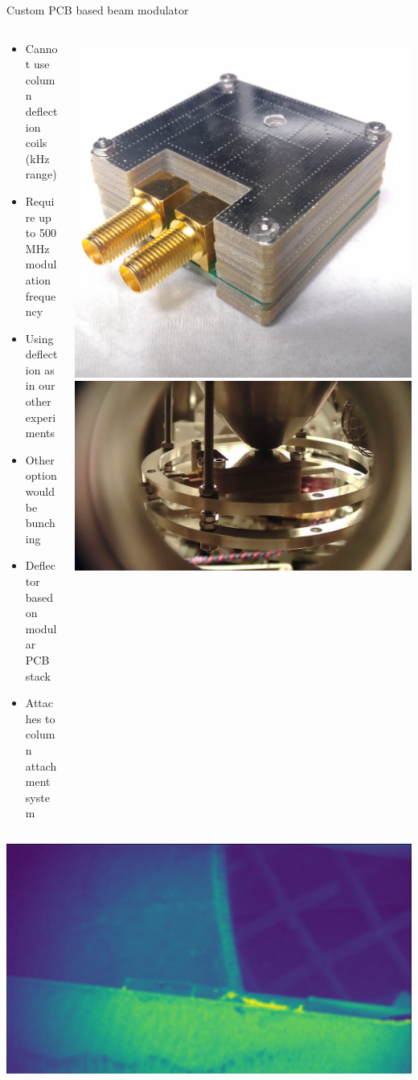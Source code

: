 \documentclass[final]{beamer}
\begin{document}
\begin{frame}[fragile]{}
\begin{columns}[T]
\begin{column}{.49\linewidth}
	\begin{block}{\Large Custom PCB based beam modulator}
		\begin{columns}
			\begin{column}{0.45\columnwidth}
				\begin{itemize}
					\item Cannot use column deflection coils (kHz range)
					\item Require up to 500 MHz modulation frequency
					\item Using deflection as in our other experiments
					\item Other option would be bunching
					\item Deflector based on modular PCB stack
					\item Attaches to column attachment system
				\end{itemize}
			\end{column}
			\begin{column}{0.45\columnwidth}
				\includegraphics[width=0.49\columnwidth]{./figures/kicker2_02.jpg}
				\includegraphics[width=0.49\columnwidth]{./figures/colattach03.png}
			\end{column}
		\end{columns}
		\vspace{1cm}
		\begin{columns}
			\begin{column}{0.45\columnwidth}
				\includegraphics[width=0.49\columnwidth]{./figures/kickertest01.png}

\end{column}
\end{columns}
\end{block}
\end{column}
\end{columns}
\end{frame}
\end{document}
